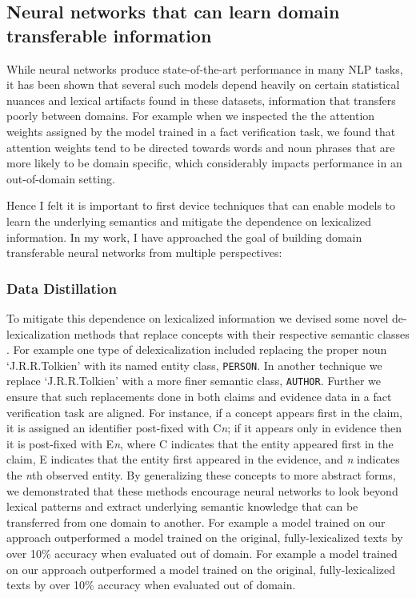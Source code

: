\documentclass[10pt]{article}
\begin{document}
\subsection{Neural networks that can learn domain transferable information}While neural networks produce state-of-the-art performance in many NLP tasks, it has been shown that several such models depend heavily on certain statistical nuances and lexical artifacts found in these datasets, information that transfers poorly between domains.
For example when we inspected the  the attention weights assigned by the model trained in a fact verification task, we found that attention weights tend to be directed towards words and noun phrases that are more likely to be domain specific, which considerably
impacts performance in an out-of-domain setting.

Hence I felt it is important to first device techniques that can enable models to learn the underlying semantics and mitigate the dependence on lexicalized information.
In my work, I have approached the goal of building domain transferable neural networks from multiple perspectives:
\subsubsection{Data Distillation}
To mitigate this dependence on lexicalized information 
we devised some novel de-lexicalization methods
that replace concepts with their respective semantic classes \cite{panenghat2020towards,suntwal-etal-2019-importance}. For example one type of delexicalization included replacing the proper noun `J.R.R.Tolkien' with its named entity class, \texttt{PERSON}. In another technique we replace `J.R.R.Tolkien' with a more finer semantic class, \texttt{AUTHOR}. Further we ensure that such replacements done in both claims and evidence data in a fact verification task are aligned.  For instance, if a concept appears first in the claim, it is assigned an identifier post-fixed with C{\em n}; if it appears only in evidence then it is post-fixed with E{\em n}, where C indicates that the entity appeared first in the claim, E indicates that the entity first appeared in the evidence, and {\em n} indicates the {\em n}th observed entity. By generalizing these concepts to more abstract forms, we demonstrated that these methods encourage neural networks to look beyond lexical patterns and extract underlying semantic knowledge that can be transferred from one domain to another. For example a model trained on our approach outperformed a model trained on the original, fully-lexicalized texts by over 10\% accuracy when evaluated out of domain. For example a model trained on our approach outperformed a model trained on the original, fully-lexicalized texts by over 10\% accuracy when evaluated out of domain.
 
\end{document}
